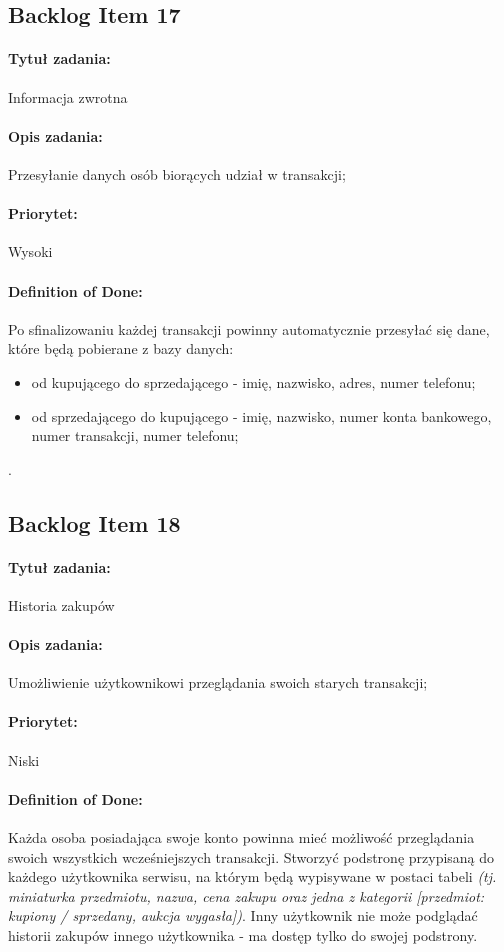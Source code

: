 \documentclass[a4paper]{article}
\begin{document}
	\subsection{Backlog Item 17}
	\paragraph{Tytuł zadania:} Informacja zwrotna
	\paragraph{Opis zadania:} Przesyłanie danych osób biorących udział w transakcji;
	\paragraph{Priorytet:} Wysoki
	\paragraph{Definition of Done:} Po sfinalizowaniu każdej transakcji powinny automatycznie przesyłać się dane, które będą pobierane z bazy danych:
	\begin{itemize}
		\item od kupującego do sprzedającego - imię, nazwisko, adres, numer telefonu;
		\item od sprzedającego do kupującego - imię, nazwisko, numer konta bankowego, numer transakcji, numer telefonu;
	\end{itemize}.
	
	\subsection{Backlog Item 18}
	\paragraph{Tytuł zadania:} Historia zakupów
	\paragraph{Opis zadania:} Umożliwienie użytkownikowi przeglądania swoich starych transakcji;
	\paragraph{Priorytet:} Niski
	\paragraph{Definition of Done:} Każda osoba posiadająca swoje konto powinna mieć możliwość przeglądania swoich wszystkich wcześniejszych transakcji. Stworzyć podstronę przypisaną do każdego użytkownika serwisu, na którym będą wypisywane w postaci tabeli \emph{(tj. miniaturka przedmiotu, nazwa, cena zakupu oraz jedna z kategorii [przedmiot: kupiony / sprzedany, aukcja wygasła])}. Inny użytkownik nie może podglądać historii zakupów innego użytkownika - ma dostęp tylko do swojej podstrony.
	
\end{document}

